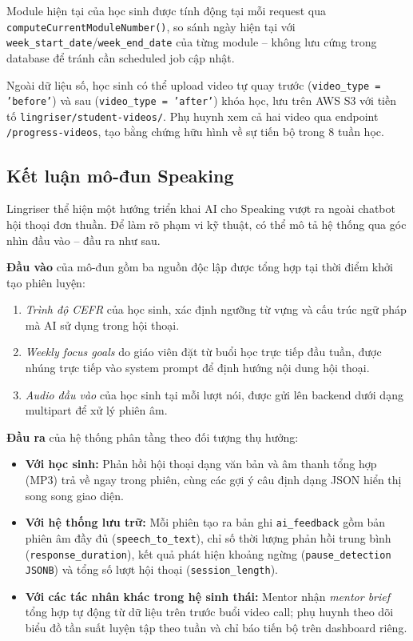Module hiện tại của học sinh được tính động tại mỗi request qua \texttt{computeCurrentModuleNumber()}, so sánh ngày hiện tại với \texttt{week\_start\_date}/\texttt{week\_end\_date} của từng module -- không lưu cứng trong database để tránh cần scheduled job cập nhật.

Ngoài dữ liệu số, học sinh có thể upload video tự quay trước (\texttt{video\_type = 'before'}) và sau (\texttt{video\_type = 'after'}) khóa học, lưu trên AWS S3 với tiền tố \texttt{lingriser/student-videos/}. Phụ huynh xem cả hai video qua endpoint \texttt{/progress-videos}, tạo bằng chứng hữu hình về sự tiến bộ trong 8 tuần học.

\subsection{Kết luận mô-đun Speaking}

Lingriser thể hiện một hướng triển khai AI cho Speaking vượt ra ngoài chatbot hội thoại đơn thuần.
Để làm rõ phạm vi kỹ thuật, có thể mô tả hệ thống qua góc nhìn đầu vào -- đầu ra như sau.

\textbf{Đầu vào} của mô-đun gồm ba nguồn độc lập được tổng hợp tại thời điểm khởi tạo phiên luyện:

\begin{enumerate}
    \item \textit{Trình độ CEFR} của học sinh, xác định ngưỡng từ vựng và cấu trúc ngữ pháp mà AI sử dụng trong hội thoại.
    \item \textit{Weekly focus goals} do giáo viên đặt từ buổi học trực tiếp đầu tuần, được nhúng trực tiếp vào system prompt để định hướng nội dung hội thoại.
    \item \textit{Audio đầu vào} của học sinh tại mỗi lượt nói, được gửi lên backend dưới dạng multipart để xử lý phiên âm.
\end{enumerate}

\textbf{Đầu ra} của hệ thống phân tầng theo đối tượng thụ hưởng:

\begin{itemize}
    \item \textbf{Với học sinh:} Phản hồi hội thoại dạng văn bản và âm thanh tổng hợp (MP3) trả về ngay trong phiên, cùng các gợi ý câu định dạng JSON hiển thị song song giao diện.
    \item \textbf{Với hệ thống lưu trữ:} Mỗi phiên tạo ra bản ghi \texttt{ai\_feedback} gồm bản phiên âm đầy đủ (\texttt{speech\_to\_text}), chỉ số thời lượng phản hồi trung bình (\texttt{response\_duration}), kết quả phát hiện khoảng ngừng (\texttt{pause\_detection JSONB}) và tổng số lượt hội thoại (\texttt{session\_length}).
    \item \textbf{Với các tác nhân khác trong hệ sinh thái:} Mentor nhận \textit{mentor brief} tổng hợp tự động từ dữ liệu trên trước buổi video call; phụ huynh theo dõi biểu đồ tần suất luyện tập theo tuần và chỉ báo tiến bộ trên dashboard riêng.
\end{itemize}

